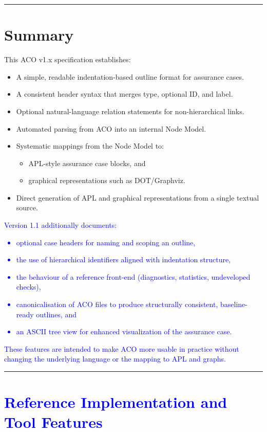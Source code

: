 \documentclass[11pt]{article}
\begin{document}
\bigskip
\hrule
\bigskip

\section{Summary}

This ACO v1.x specification establishes:

\begin{itemize}[leftmargin=2em]
  \item A simple, readable indentation-based outline format for assurance cases.
  \item A consistent header syntax that merges type, optional ID, and label.
  \item Optional natural-language relation statements for non-hierarchical links.
  \item Automated parsing from ACO into an internal Node Model.
  \item Systematic mappings from the Node Model to:
  \begin{itemize}[leftmargin=1.5em]
    \item APL-style assurance case blocks, and
    \item graphical representations such as DOT/Graphviz.
  \end{itemize}
  \item Direct generation of APL and graphical representations from a single textual source.
\end{itemize}

\textcolor{blue}{Version 1.1 additionally documents:
\begin{itemize}[leftmargin=2em]
  \item optional case headers for naming and scoping an outline,
  \item the use of hierarchical identifiers aligned with indentation structure,
  \item the behaviour of a reference front-end (diagnostics, statistics, undeveloped checks),
  \item canonicalisation of ACO files to produce structurally consistent, baseline-ready outlines, and
  \item an ASCII tree view for enhanced visualization of the assurance case.
\end{itemize}
These features are intended to make ACO more usable in practice without changing the underlying language or the mapping to APL and graphs.}

\bigskip
\hrule
\bigskip

\section{\textcolor{blue}{Reference Implementation and Tool Features}}
\end{document}
